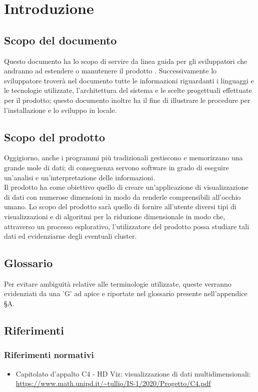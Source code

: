 \section{Introduzione}
\subsection{Scopo del documento}
Questo documento ha lo scopo di servire da linea guida per gli sviluppatori che andranno ad estendere o manutenere il prodotto \NomeProgetto{}. Successivamente lo sviluppatore troverà nel documento tutte le informazioni riguardanti i linguaggi e le tecnologie utilizzate, l'architettura del sistema e le scelte progettuali effettuate per il prodotto; questo documento inoltre ha il fine di illustrare le procedure per l'installazione e lo sviluppo in locale.

\subsection{Scopo del prodotto}
Oggigiorno, anche i programmi più tradizionali gestiscono e memorizzano una grande mole di dati; di conseguenza servono software in grado di eseguire un'analisi e un'interpretazione delle informazioni.\\
Il prodotto \NomeProgetto{} ha come obiettivo quello di creare un'applicazione di visualizzazione di dati con numerose dimensioni in modo da renderle comprensibili all'occhio umano.  Lo scopo del prodotto sarà quello di fornire all'utente diversi tipi di visualizzazioni e di algoritmi per la riduzione dimensionale in modo che, attraverso un processo esplorativo, l'utilizzatore del prodotto possa studiare tali dati ed evidenziarne degli eventuali cluster. 

\subsection{Glossario}
Per evitare ambiguità relative alle terminologie utilizzate, queste verranno evidenziati da una 'G' ad apice e riportate nel glossario presente nell'appendice \S A.

\subsection{Riferimenti}
\subsubsection{Riferimenti normativi}
\begin{itemize}
	\item	Capitolato d'appalto C4 - HD Viz: visualizzazione di dati multidimensionali: \\
	\textcolor{blue}{\url{https://www.math.unipd.it/~tullio/IS-1/2020/Progetto/C4.pdf}}
\end{itemize}

